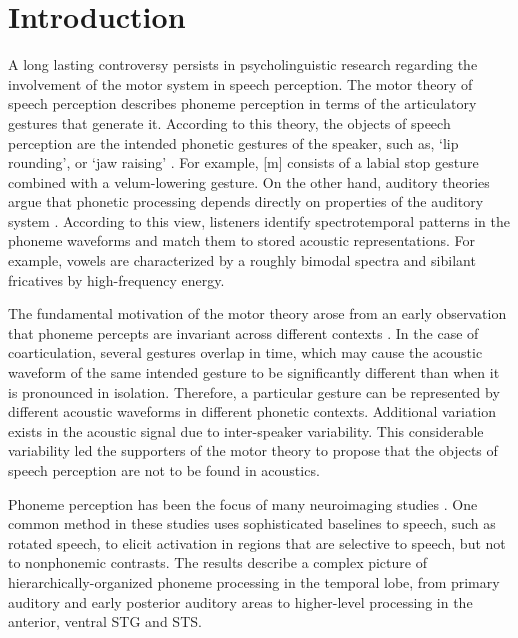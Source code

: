 \section{Introduction}
A long lasting controversy persists in psycholinguistic research regarding the involvement of the motor system in speech perception. The motor theory of speech perception describes phoneme perception in terms of the articulatory gestures that generate it. According to this theory, the objects of speech perception are the intended phonetic gestures of the speaker, such as, ‘lip rounding’, or ‘jaw raising’ \citep{liberman1967perception, liberman1985motor}. For example, [m] consists of a labial stop gesture combined with a velum-lowering gesture. On the other hand, auditory theories argue that phonetic processing depends directly on properties of the auditory system \citep{jakobson1951preliminaries, stevens1972quantal, stevens1989quantal, stevens2002toward}. According to this view, listeners identify spectrotemporal patterns in the phoneme waveforms and match them to stored acoustic representations. For example, vowels are characterized by a roughly bimodal spectra and sibilant fricatives by high-frequency energy.


The fundamental motivation of the motor theory arose from an early observation that phoneme percepts are invariant across different contexts \citep{cooper1952some, liberman1967perception}. In the case of coarticulation, several gestures overlap in time, which may cause the acoustic waveform of the same intended gesture to be significantly different than when it is pronounced in isolation. Therefore, a particular gesture can be represented by different acoustic waveforms in different phonetic contexts. Additional variation exists in the acoustic signal due to inter-speaker variability.  This considerable variability led the supporters of the motor theory to propose that the objects of speech perception are not to be found in acoustics.

Phoneme perception has been the focus of many neuroimaging studies \citep{liebenthal2005neural, dehaene2005neural, mottonen2006perceiving, desai2008left, liebenthal2010specialization,  formisano2008saying, binder2000human, Dewitt2012}. One common method in these studies uses sophisticated baselines to speech, such as rotated speech, to elicit activation in regions that are selective to speech, but not to nonphonemic contrasts.  The results describe a complex picture of hierarchically-organized phoneme processing in the temporal lobe, from primary auditory and early posterior auditory areas to higher-level processing in the anterior, ventral STG and STS. 

